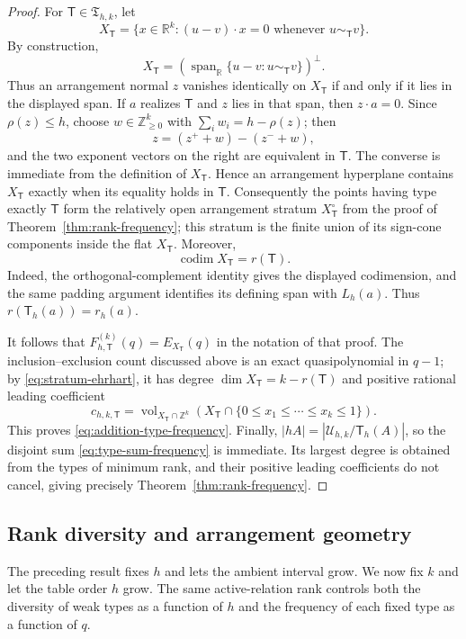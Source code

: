 \documentclass[11pt,reqno]{amsart}
\theoremstyle{definition}
\theoremstyle{remark}
\begin{document}
\begin{proof}
For $\mathsf T\in\mathfrak T_{h,k}$, let
\[
 X_{\mathsf T}=
 \{x\in\mathbb R^k:(u-v)\cdot x=0
       \text{ whenever }u\sim_{\mathsf T}v\}.
\]
By construction,
\[
 X_{\mathsf T}=
 \left(\operatorname{span}_{\mathbb R}
 \{u-v:u\sim_{\mathsf T}v\}\right)^\perp.
\]
Thus an arrangement normal $z$ vanishes identically on $X_{\mathsf T}$ if
and only if it lies in the displayed span.  If $a$ realizes $\mathsf T$ and
$z$ lies in that span, then $z\cdot a=0$.  Since $\rho(z)\leq h$, choose
$w\in\mathbb Z_{\geq0}^k$ with $\sum_iw_i=h-\rho(z)$; then
\[
 z=(z^++w)-(z^-+w),
\]
and the two exponent vectors on the right are equivalent in $\mathsf T$.
The converse is immediate from the definition of $X_{\mathsf T}$.  Hence an
arrangement hyperplane contains $X_{\mathsf T}$ exactly when its equality
holds in $\mathsf T$.  Consequently the points having type exactly
$\mathsf T$ form the relatively open arrangement stratum
$X_{\mathsf T}^{\circ}$ from the proof of
Theorem~\ref{thm:rank-frequency}; this stratum is the finite union of its
sign-cone components inside the flat $X_{\mathsf T}$.  Moreover,
\[
 \operatorname{codim}X_{\mathsf T}=r(\mathsf T).
\]
Indeed, the orthogonal-complement identity gives the displayed codimension,
and the same padding argument identifies its defining span with $L_h(a)$.
Thus $r(\mathsf T_h(a))=r_h(a)$.

It follows that $F^{(k)}_{h,\mathsf T}(q)=E_{X_{\mathsf T}}(q)$ in the
notation of that proof.  The inclusion--exclusion count discussed above is
an exact quasipolynomial in $q-1$; by \eqref{eq:stratum-ehrhart}, it has degree
$\dim X_{\mathsf T}=k-r(\mathsf T)$ and positive rational leading coefficient
\[
 c_{h,k,\mathsf T}
 =\operatorname{vol}_{X_{\mathsf T}\cap\mathbb Z^k}
 \left(X_{\mathsf T}\cap
 \{0\leq x_1\leq\cdots\leq x_k\leq1\}\right).
\]
This proves \eqref{eq:addition-type-frequency}.  Finally,
$|hA|=|\mathcal U_{h,k}/\mathsf T_h(A)|$, so the disjoint sum
\eqref{eq:type-sum-frequency} is immediate.  Its largest degree is obtained
from the types of minimum rank, and their positive leading coefficients do
not cancel, giving precisely Theorem~\ref{thm:rank-frequency}.
\end{proof}

\subsection{Rank diversity and arrangement geometry}
\label{subsec:rank-diversity}

The preceding result fixes $h$ and lets the ambient interval grow.  We now
fix $k$ and let the table order $h$ grow.  The same active-relation rank
controls both the diversity of weak types as a function of $h$ and the
frequency of each fixed type as a function of $q$.
\end{document}
